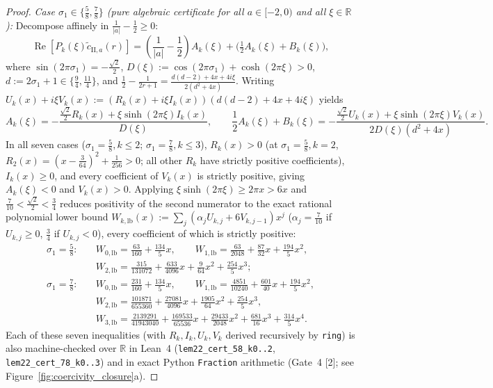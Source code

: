 \documentclass[11pt,a4paper]{article}
\begin{document}
\begin{proof}
\emph{Case $\sigma_1 \in \{\frac{5}{8}, \frac{7}{8}\}$ (pure algebraic certificate for all $a \in [-2,0)$ and all $\xi \in \mathbb{R}$):} Decompose affinely in $\frac{1}{|a|} - \frac{1}{2} \ge 0$:
\[
\operatorname{Re}[P_k(\xi)\tilde c_{\mathrm{II},a}(r)] = \left(\frac{1}{|a|} - \frac{1}{2}\right)A_k(\xi) + \Big(\tfrac{1}{2}A_k(\xi) + B_k(\xi)\Big),
\]
where $\sin(2\pi\sigma_1) = -\frac{\sqrt{2}}{2}$, $D(\xi) := \cos(2\pi\sigma_1) + \cosh(2\pi\xi) > 0$, $d := 2\sigma_1 + 1 \in \{\frac{9}{4}, \frac{11}{4}\}$, and $\frac{1}{2} - \frac{1}{2r+1} = \frac{d(d-2)+4x+4i\xi}{2(d^2+4x)}$. Writing $U_k(x) + i\xi V_k(x) := (R_k(x) + i\xi I_k(x))(d(d-2) + 4x + 4i\xi)$ yields
\[
A_k(\xi) = -\frac{\frac{\sqrt{2}}{2}R_k(x) + \xi\sinh(2\pi\xi)I_k(x)}{D(\xi)}, \qquad
\frac{1}{2}A_k(\xi) + B_k(\xi) = -\frac{\frac{\sqrt{2}}{2}U_k(x) + \xi\sinh(2\pi\xi)V_k(x)}{2 D(\xi)(d^2 + 4x)}.
\]
In all seven cases ($\sigma_1 = \frac{5}{8}, k\le 2$; $\sigma_1 = \frac{7}{8}, k\le 3$), $R_k(x) > 0$ (at $\sigma_1 = \frac{5}{8}, k=2$, $R_2(x) = (x-\frac{3}{64})^2 + \frac{1}{256} > 0$; all other $R_k$ have strictly positive coefficients), $I_k(x) \ge 0$, and every coefficient of $V_k(x)$ is strictly positive, giving $A_k(\xi) < 0$ and $V_k(x) > 0$. Applying $\xi\sinh(2\pi\xi) \ge 2\pi x > 6x$ and $\frac{7}{10} < \frac{\sqrt{2}}{2} < \frac{3}{4}$ reduces positivity of the second numerator to the exact rational polynomial lower bound $W_{k,\mathrm{lb}}(x) := \sum_j (\alpha_j U_{k,j} + 6 V_{k,j-1})x^j$ ($\alpha_j = \frac{7}{10}$ if $U_{k,j} \ge 0$, $\frac{3}{4}$ if $U_{k,j} < 0$), every coefficient of which is strictly positive:
\begin{align*}
\sigma_1 = \tfrac{5}{8}:\quad & W_{0,\mathrm{lb}} = \tfrac{63}{160} + \tfrac{134}{5}x, \qquad W_{1,\mathrm{lb}} = \tfrac{63}{2048} + \tfrac{87}{32}x + \tfrac{194}{5}x^2, \\
& W_{2,\mathrm{lb}} = \tfrac{315}{131072} + \tfrac{633}{4096}x + \tfrac{9}{64}x^2 + \tfrac{254}{5}x^3; \\
\sigma_1 = \tfrac{7}{8}:\quad & W_{0,\mathrm{lb}} = \tfrac{231}{160} + \tfrac{134}{5}x, \qquad W_{1,\mathrm{lb}} = \tfrac{4851}{10240} + \tfrac{601}{40}x + \tfrac{194}{5}x^2, \\
& W_{2,\mathrm{lb}} = \tfrac{101871}{655360} + \tfrac{27081}{4096}x + \tfrac{1905}{64}x^2 + \tfrac{254}{5}x^3, \\
& W_{3,\mathrm{lb}} = \tfrac{2139291}{41943040} + \tfrac{169533}{65536}x + \tfrac{29433}{2048}x^2 + \tfrac{681}{16}x^3 + \tfrac{314}{5}x^4.
\end{align*}
Each of these seven inequalities (with $R_k, I_k, U_k, V_k$ derived recursively by \texttt{ring}) is also machine-checked over $\mathbb{R}$ in Lean~4 (\texttt{lem22\_cert\_58\_k0..2}, \texttt{lem22\_cert\_78\_k0..3}) and in exact Python \texttt{Fraction} arithmetic (Gate~4 {[2]}; see Figure~\ref{fig:coercivity_closure}a).
\end{proof}
\end{document}
